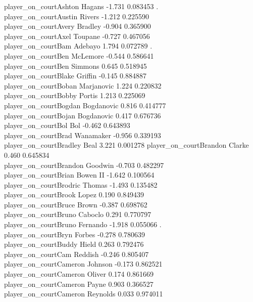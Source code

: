 \documentclass[
  landscape]{article}
\begin{document}
{player\_on\_courtAshton Hagans -1.731 0.083453 .\\
player\_on\_courtAustin Rivers -1.212 0.225590\\
player\_on\_courtAvery Bradley -0.904 0.365900\\
player\_on\_courtAxel Toupane -0.727 0.467056\\
player\_on\_courtBam Adebayo 1.794 0.072789 .\\
player\_on\_courtBen McLemore -0.544 0.586641\\
player\_on\_courtBen Simmons 0.645 0.518945\\
player\_on\_courtBlake Griffin -0.145 0.884887\\
player\_on\_courtBoban Marjanovic 1.224 0.220832\\
player\_on\_courtBobby Portis 1.213 0.225069\\
player\_on\_courtBogdan Bogdanovic 0.816 0.414777\\
player\_on\_courtBojan Bogdanovic 0.417 0.676736\\
player\_on\_courtBol Bol -0.462 0.643893\\
player\_on\_courtBrad Wanamaker -0.956 0.339193\\
player\_on\_courtBradley Beal 3.221 0.001278 } player\_on\_courtBrandon
Clarke 0.460 0.645834\\
player\_on\_courtBrandon Goodwin -0.703 0.482297\\
player\_on\_courtBrian Bowen II -1.642 0.100564\\
player\_on\_courtBrodric Thomas -1.493 0.135482\\
player\_on\_courtBrook Lopez 0.190 0.849439\\
player\_on\_courtBruce Brown -0.387 0.698762\\
player\_on\_courtBruno Caboclo 0.291 0.770797\\
player\_on\_courtBruno Fernando -1.918 0.055066 .\\
player\_on\_courtBryn Forbes -0.278 0.780639\\
player\_on\_courtBuddy Hield 0.263 0.792476\\
player\_on\_courtCam Reddish -0.246 0.805407\\
player\_on\_courtCameron Johnson -0.173 0.862521\\
player\_on\_courtCameron Oliver 0.174 0.861669\\
player\_on\_courtCameron Payne 0.903 0.366527\\
player\_on\_courtCameron Reynolds 0.033 0.974011\\
\end{document}
